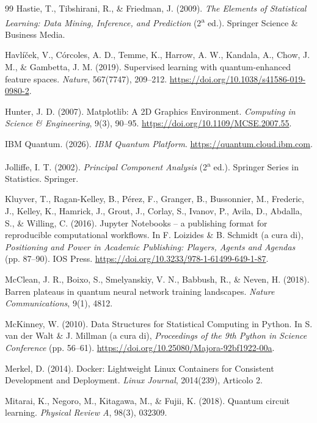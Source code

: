 \begin{thebibliography}{99}
Hastie, T., Tibshirani, R., \& Friedman, J. (2009). \textit{The Elements of Statistical Learning: Data Mining, Inference, and Prediction} (2\textsuperscript{a} ed.). Springer Science \& Business Media.

Havlíček, V., Córcoles, A. D., Temme, K., Harrow, A. W., Kandala, A., Chow, J. M., \& Gambetta, J. M. (2019). Supervised learning with quantum-enhanced feature spaces. \textit{Nature}, 567(7747), 209--212. \url{https://doi.org/10.1038/s41586-019-0980-2}.

Hunter, J. D. (2007). Matplotlib: A 2D Graphics Environment. \textit{Computing in Science \& Engineering}, 9(3), 90--95. \url{https://doi.org/10.1109/MCSE.2007.55}.

IBM Quantum. (2026). \textit{IBM Quantum Platform}. \url{https://quantum.cloud.ibm.com}.

Jolliffe, I. T. (2002). \textit{Principal Component Analysis} (2\textsuperscript{a} ed.). Springer Series in Statistics. Springer.

Kluyver, T., Ragan-Kelley, B., Pérez, F., Granger, B., Bussonnier, M., Frederic, J., Kelley, K., Hamrick, J., Grout, J., Corlay, S., Ivanov, P., Avila, D., Abdalla, S., \& Willing, C. (2016). Jupyter Notebooks -- a publishing format for reproducible computational workflows. In F. Loizides \& B. Schmidt (a cura di), \textit{Positioning and Power in Academic Publishing: Players, Agents and Agendas} (pp. 87--90). IOS Press. \url{https://doi.org/10.3233/978-1-61499-649-1-87}.

McClean, J. R., Boixo, S., Smelyanskiy, V. N., Babbush, R., \& Neven, H. (2018). Barren plateaus in quantum neural network training landscapes. \textit{Nature Communications}, 9(1), 4812.

McKinney, W. (2010). Data Structures for Statistical Computing in Python. In S. van der Walt \& J. Millman (a cura di), \textit{Proceedings of the 9th Python in Science Conference} (pp. 56--61). \url{https://doi.org/10.25080/Majora-92bf1922-00a}.

Merkel, D. (2014). Docker: Lightweight Linux Containers for Consistent Development and Deployment. \textit{Linux Journal}, 2014(239), Articolo 2.

Mitarai, K., Negoro, M., Kitagawa, M., \& Fujii, K. (2018). Quantum circuit learning. \textit{Physical Review A}, 98(3), 032309.


\end{thebibliography}
